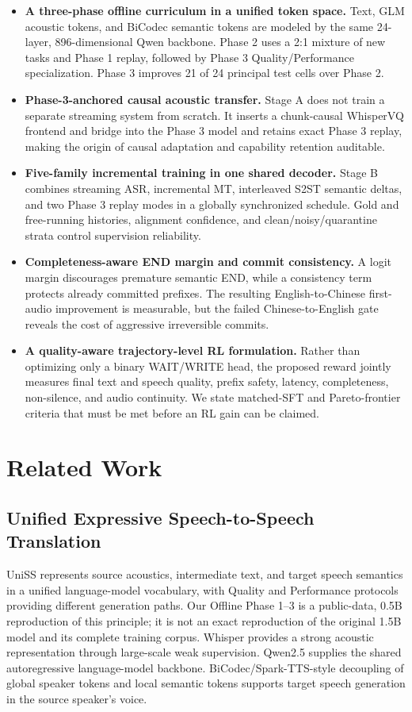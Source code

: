 \documentclass[11pt,a4paper]{article}
\begin{document}
\begin{itemize}
  \item \textbf{A three-phase offline curriculum in a unified token space.} Text, GLM acoustic tokens, and BiCodec semantic tokens are modeled by the same 24-layer, 896-dimensional Qwen backbone. Phase 2 uses a 2:1 mixture of new tasks and Phase 1 replay, followed by Phase 3 Quality/Performance specialization. Phase 3 improves 21 of 24 principal test cells over Phase 2.
  \item \textbf{Phase-3-anchored causal acoustic transfer.} Stage A does not train a separate streaming system from scratch. It inserts a chunk-causal WhisperVQ frontend and bridge into the Phase 3 model and retains exact Phase 3 replay, making the origin of causal adaptation and capability retention auditable.
  \item \textbf{Five-family incremental training in one shared decoder.} Stage B combines streaming ASR, incremental MT, interleaved S2ST semantic deltas, and two Phase 3 replay modes in a globally synchronized schedule. Gold and free-running histories, alignment confidence, and clean/noisy/quarantine strata control supervision reliability.
  \item \textbf{Completeness-aware END margin and commit consistency.} A logit margin discourages premature semantic END, while a consistency term protects already committed prefixes. The resulting English-to-Chinese first-audio improvement is measurable, but the failed Chinese-to-English gate reveals the cost of aggressive irreversible commits.
  \item \textbf{A quality-aware trajectory-level RL formulation.} Rather than optimizing only a binary WAIT/WRITE head, the proposed reward jointly measures final text and speech quality, prefix safety, latency, completeness, non-silence, and audio continuity. We state matched-SFT and Pareto-frontier criteria that must be met before an RL gain can be claimed.
\end{itemize}

\section{Related Work}

\subsection{Unified Expressive Speech-to-Speech Translation}

UniSS represents source acoustics, intermediate text, and target speech semantics in a unified language-model vocabulary, with Quality and Performance protocols providing different generation paths\cite{cheng2025uniss}. Our Offline Phase 1--3 is a public-data, 0.5B reproduction of this principle; it is not an exact reproduction of the original 1.5B model and its complete training corpus. Whisper provides a strong acoustic representation through large-scale weak supervision\cite{radford2022whisper}. Qwen2.5 supplies the shared autoregressive language-model backbone\cite{yang2024qwen25}. BiCodec/Spark-TTS-style decoupling of global speaker tokens and local semantic tokens supports target speech generation in the source speaker's voice\cite{wang2025sparktts}.
\end{document}
